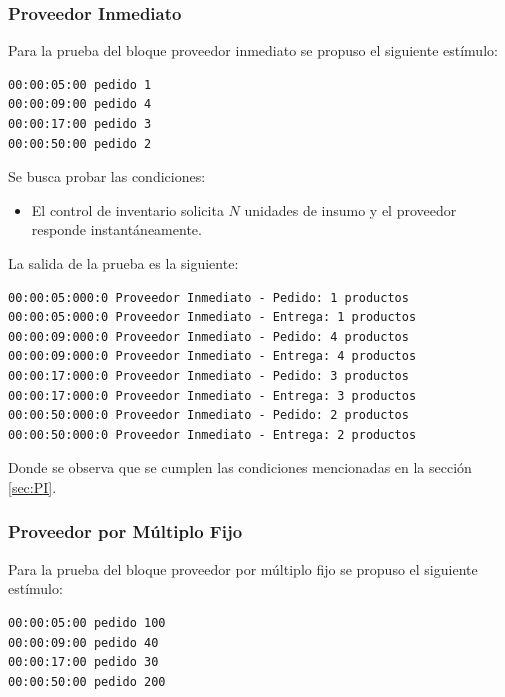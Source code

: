 \documentclass[10pt]{article}
\begin{document}
\subsubsection{Proveedor Inmediato}
Para la prueba del bloque proveedor inmediato se propuso el siguiente estímulo:

\begin{minipage}{1\textwidth}
	\centering
	\begin{lstlisting}
00:00:05:00 pedido 1 
00:00:09:00 pedido 4
00:00:17:00 pedido 3
00:00:50:00 pedido 2
	\end{lstlisting}
\end{minipage}

Se busca probar las condiciones:
\begin{itemize}
	\item El control de inventario solicita $N$ unidades de insumo y el proveedor responde instantáneamente. 
\end{itemize}

La salida de la prueba es la siguiente:

\begin{minipage}{1\textwidth}
	\centering
	\begin{lstlisting}
00:00:05:000:0 Proveedor Inmediato - Pedido: 1 productos
00:00:05:000:0 Proveedor Inmediato - Entrega: 1 productos
00:00:09:000:0 Proveedor Inmediato - Pedido: 4 productos
00:00:09:000:0 Proveedor Inmediato - Entrega: 4 productos
00:00:17:000:0 Proveedor Inmediato - Pedido: 3 productos
00:00:17:000:0 Proveedor Inmediato - Entrega: 3 productos
00:00:50:000:0 Proveedor Inmediato - Pedido: 2 productos
00:00:50:000:0 Proveedor Inmediato - Entrega: 2 productos
	\end{lstlisting}
	
\end{minipage}

Donde se observa que se cumplen las condiciones mencionadas en la sección \ref{sec:PI}.

\subsubsection{Proveedor por Múltiplo Fijo}
Para la prueba del bloque proveedor por múltiplo fijo se propuso el siguiente estímulo:

\begin{minipage}{1\textwidth}
	\centering
	\begin{lstlisting}
00:00:05:00 pedido 100
00:00:09:00 pedido 40
00:00:17:00 pedido 30
00:00:50:00 pedido 200
	\end{lstlisting}
\end{minipage}
\end{document}
